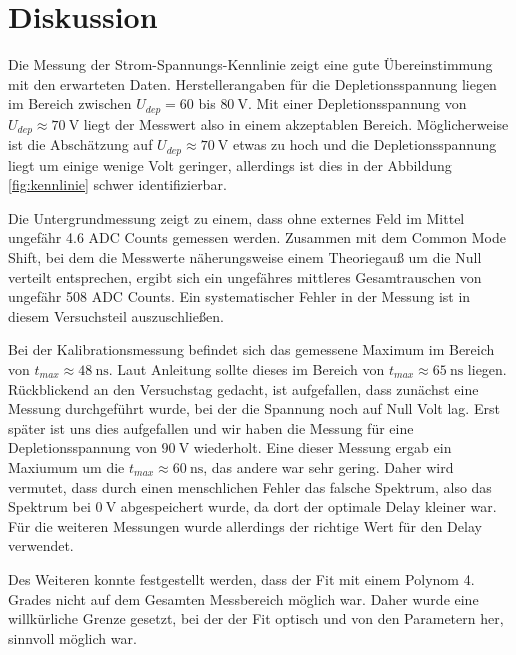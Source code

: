 \section{Diskussion}
\label{sec:diskussion}

Die Messung der Strom-Spannungs-Kennlinie zeigt eine gute Übereinstimmung mit 
den erwarteten Daten. Herstellerangaben für die Depletionsspannung liegen 
im Bereich zwischen $U_{dep} = 60$ bis $\SI{80}{\volt}$. Mit einer 
Depletionsspannung von $U_{dep} \approx \SI{70}{\volt}$ liegt der 
Messwert also in einem akzeptablen Bereich. Möglicherweise ist die 
Abschätzung auf $U_{dep} \approx \SI{70}{\volt}$ etwas zu hoch und die 
Depletionsspannung liegt um einige wenige Volt geringer, allerdings ist dies 
in der Abbildung \ref{fig:kennlinie} schwer identifizierbar. \par \medskip

Die Untergrundmessung zeigt zu einem, dass ohne externes Feld im Mittel 
ungefähr 4.6 ADC Counts gemessen werden. Zusammen mit dem Common Mode Shift, 
bei dem die Messwerte näherungsweise einem Theoriegauß um die Null verteilt 
entsprechen, ergibt sich ein ungefähres mittleres Gesamtrauschen von 
ungefähr 508 ADC Counts. Ein systematischer Fehler in der Messung ist in diesem 
Versuchsteil auszuschließen. \par \medskip

Bei der Kalibrationsmessung befindet sich das gemessene Maximum im Bereich von 
$t_{max} \approx \SI{48}{\nano\second}$. Laut Anleitung \cite{Anleitung} sollte 
dieses im Bereich von $t_{max} \approx \SI{65}{\nano\second}$ liegen. 
Rückblickend an den Versuchstag gedacht, ist aufgefallen, dass zunächst eine 
Messung durchgeführt wurde, bei der die Spannung noch auf Null Volt lag. Erst 
später ist uns dies aufgefallen und wir haben die Messung für eine 
Depletionsspannung von $\SI{90}{\volt}$ wiederholt. Eine dieser Messung ergab 
ein Maxiumum um die $t_{max} \approx \SI{60}{\nano\second}$, das andere 
war sehr gering. Daher wird vermutet, dass durch einen menschlichen Fehler 
das falsche Spektrum, also das Spektrum bei $\SI{0}{\volt}$ abgespeichert wurde, 
da dort der optimale Delay kleiner war. Für die weiteren Messungen 
wurde allerdings der richtige Wert für den Delay verwendet. \par \smallskip 

Des Weiteren konnte festgestellt werden, dass der Fit mit einem Polynom 4. Grades 
nicht auf dem Gesamten Messbereich möglich war. Daher wurde eine willkürliche 
Grenze gesetzt, bei der der Fit optisch und von den Parametern her, sinnvoll 
möglich war. \par \medskip 

